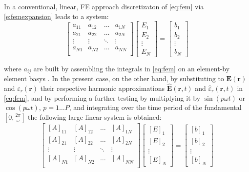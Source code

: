 \documentclass[journal]{IEEEtran}
\renewcommand{\vec}[1]{\mathbf{#1}}
\begin{document}
In a conventional, linear, FE approach discretizaton of \eqref{eq:fem} via
\eqref{e:femexpansion} leads to a system:
%
\begin{equation}\label{e:plainfem}
\begin{bmatrix}
a_{11} & a_{12} & \ldots & a_{1N} \\
a_{21} & a_{22} & \ldots & a_{2N} \\
\vdots & \vdots & \ddots & \vdots \\
a_{N1} & a_{N2} & \ldots & a_{NN} \\
\end{bmatrix}
\begin{bmatrix}
E_1\\
E_2\\
\vdots\\
E_N
\end{bmatrix}
=
\begin{bmatrix}
b_1\\
b_2\\
\vdots\\
b_N
\end{bmatrix}
\end{equation}

\noindent where $a_{ij}$ are built by assembling the integrals in \eqref{eq:fem}
on an element-by element basys \cite{Pelosi2009}. In the present case, on the
other hand, by substituting to $\vec{E}(\vec{r})$ and
${\varepsilon}_r(\vec{r})$ their respective harmonic approximations $\vec{\hat{E}}(\vec{r}, t)$ and
$\hat{{\varepsilon}}_r(\vec{r}, t)$ in \eqref{eq:fem}, and by performing
a further testing by multiplying it by $\sin(p \omega t)$ or
$\cos(p \omega t)$, $p = 1 \dots P$, and integrating over the time period of the fundamental $\left [
0,\frac{2\pi}{\omega} \right ]$  the following large linear system is
obtained:
%
\begin{equation}\label{e:HBfem}
\begin{bmatrix}
[A]_{11} & [A]_{12} & \ldots & [A]_{1N} \\
[A]_{21} & [A]_{22} & \ldots & [A]_{2N} \\
\vdots & \vdots & \ddots & \vdots \\
[A]_{N1} & [A]_{N2} & \ldots & [A]_{NN} \\
\end{bmatrix}
\begin{bmatrix}
[E]_1\\
[E]_2\\
\vdots\\
[E]_N
\end{bmatrix}
=
\begin{bmatrix}
[b]_1\\
[b]_2\\
\vdots\\
[b]_N
\end{bmatrix}
\end{equation}
\end{document}
